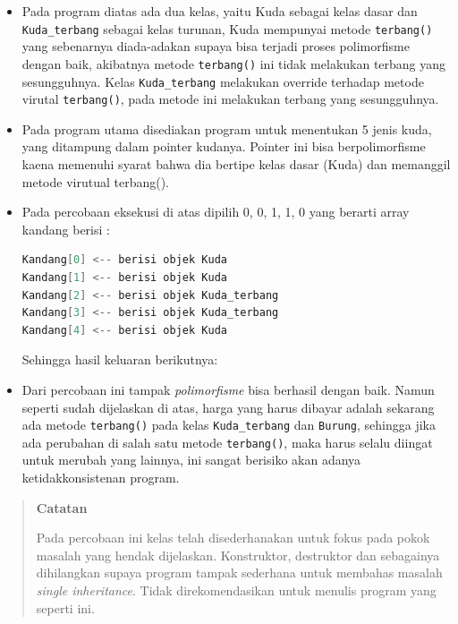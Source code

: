 \begin{itemize}
\item
 Pada program diatas ada dua kelas, yaitu Kuda sebagai kelas dasar dan
 \texttt{Kuda\_terbang} sebagai kelas turunan, Kuda mempunyai metode
 \texttt{terbang()} yang sebenarnya diada-adakan supaya bisa terjadi
 proses polimorfisme dengan baik, akibatnya metode \texttt{terbang()}
 ini tidak melakukan terbang yang sesungguhnya. Kelas
 \texttt{Kuda\_terbang} melakukan override terhadap metode virutal
 \texttt{terbang()}, pada metode ini melakukan terbang yang
 sesungguhnya.
\item
 Pada program utama disediakan program untuk menentukan 5 jenis kuda,
 yang ditampung dalam pointer kudanya. Pointer ini bisa berpolimorfisme
 kaena memenuhi syarat bahwa dia bertipe kelas dasar (Kuda) dan
 memanggil metode virutual terbang().
\item
 Pada percobaan eksekusi di atas dipilih 0, 0, 1, 1, 0 yang berarti
 array kandang berisi :

\begin{lstlisting}[language=c++, numbers=none]
Kandang[0] <-- berisi objek Kuda
Kandang[1] <-- berisi objek Kuda
Kandang[2] <-- berisi objek Kuda_terbang
Kandang[3] <-- berisi objek Kuda_terbang
Kandang[4] <-- berisi objek Kuda
\end{lstlisting}

 Sehingga hasil keluaran berikutnya:


\item
 Dari percobaan ini tampak \emph{polimorfisme} bisa berhasil dengan
 baik. Namun seperti sudah dijelaskan di atas, harga yang harus dibayar
 adalah sekarang ada metode \texttt{terbang()} pada kelas
 \texttt{Kuda\_terbang} dan \texttt{Burung}, sehingga jika ada
 perubahan di salah satu metode \texttt{terbang()}, maka harus selalu
 diingat untuk merubah yang lainnya, ini sangat berisiko akan adanya
 ketidakkonsistenan program.
\end{itemize}
\begin{quotation}
 {\LARGE {}} \textbf{Catatan}

	Pada	percobaan ini kelas telah disederhanakan untuk fokus pada pokok masalah
	yang hendak dijelaskan. Konstruktor, destruktor dan sebagainya
	dihilangkan supaya program tampak sederhana untuk membahas masalah
	\emph{single inheritance}. Tidak direkomendasikan untuk menulis program
	yang seperti ini.
\end{quotation}


